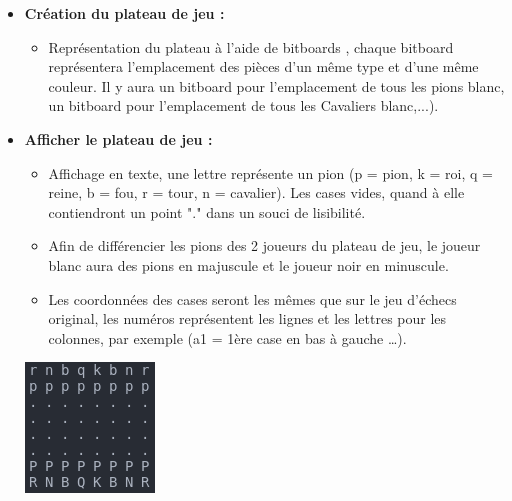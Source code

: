 \documentclass{article}
\begin{document}
\begin{itemize}

\subsection{Liste des besoins fonctionnels}
\medskip

    \item \textbf{Création du plateau de jeu : }
    \medskip
    \begin{itemize}
        \item Représentation du plateau à l'aide de bitboards \cite{Bitboards}, chaque bitboard représentera l'emplacement des pièces d'un même type et d'une même couleur. Il y aura un bitboard pour l'emplacement de tous les pions blanc, un bitboard pour l'emplacement de tous les Cavaliers blanc,...).
    \end{itemize}
    \medskip
    \item \textbf{Afficher le plateau de jeu : }
    \medskip
    \begin{itemize}
        \item Affichage en texte, une lettre représente un pion (p = pion, k = roi, q = reine,
        b = fou, r = tour, n = cavalier).
        Les cases vides, quand à elle contiendront un point "." dans un souci de lisibilité.
        \item Afin de différencier les pions des 2 joueurs du plateau de jeu, le joueur blanc aura des pions en majuscule et le joueur noir en minuscule.
        \item Les coordonnées des cases seront les mêmes que sur le jeu d'échecs original, les numéros représentent les lignes et les lettres pour les colonnes, par exemple (a1 = 1ère case en bas à gauche \dots).
    \end{itemize}
    \centerline{\includegraphics[scale = 0.5]{img/echecs_title.png}}

\end{itemize}
\end{document}
